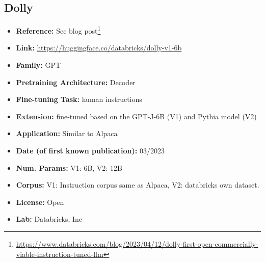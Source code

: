 \documentclass{article}
\begin{document}
\subsection{Dolly}
            \begin{itemize}
                \item \textbf{Reference:} See blog post\footnote{\url{https://www.databricks.com/blog/2023/04/12/dolly-first-open-commercially-viable-instruction-tuned-llm}}
                \item \textbf{Link:} \url{https://huggingface.co/databricks/dolly-v1-6b}
                \item \textbf{Family:} GPT
                \item \textbf{Pretraining Architecture:} Decoder
                \item \textbf{Fine-tuning Task:} human instructions
                \item \textbf{Extension:} fine-tuned based on the GPT-J-6B (V1) and Pythia model (V2)
                \item \textbf{Application:} Similar to Alpaca
                \item \textbf{Date (of first known publication):} 03/2023
                \item \textbf{Num. Params:} V1: 6B, V2: 12B
                \item \textbf{Corpus:} V1: Instruction corpus same as Alpaca, V2: databricks own dataset.
                \item \textbf{License:} Open
                \item \textbf{Lab:} Databricks, Inc
            \end{itemize}


\end{document}
